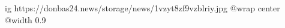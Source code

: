  
 
 
 
 

\ifcmt
  ig https://donbas24.news/storage/news/1vzyt8zf9vzblriy.jpg
  @wrap center
  @width 0.9
\fi

